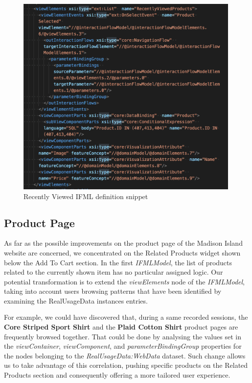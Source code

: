 \vspace{0.5cm}
\begin{figure}[H]
  \centering
    \includegraphics[height=10cm]{images/madison/ifml-recently-viewed.png}
  \caption{Recently Viewed IFML definition snippet}
  \label{fig:recently-viewed-ifml-definition}
\end{figure}
\vspace{0.5cm}

\subsection{Product Page}
\label{product-page-updates}

As far as the possible improvements on the product page of the Madison Island website are concerned, we concentrated on the Related Products widget shown below the Add To Cart section. In the first \textit{IFMLModel}, the list of products related to the currently shown item has no particular assigned logic. Our potential transformation is to extend the \textit{viewElements} node of the \textit{IFMLModel}, taking into account users browsing patterns that have been identified by examining the RealUsageData instances entries.

For example, we could have discovered that, during a same recorded sessions, the \textbf{Core Striped Sport Shirt} and the \textbf{Plaid Cotton Shirt} product pages are frequently browsed together. That could be done by analysing the values set in the \textit{viewContainer}, \textit{viewComponent}, and \textit{parameterBindingGroup} properties for the nodes belonging to the \textit{RealUsageData:WebData} dataset. Such change allows us to take advantage of this correlation, pushing specific products on the Related Products section and consequently offering a more tailored user experience.

